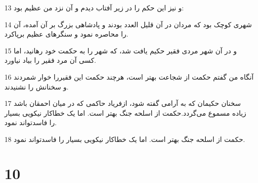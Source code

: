 \par 13 و نیز این حکم را در زیر آفتاب دیدم و آن نزد من عظیم بود:
\par 14 شهری کوچک بود که مردان در آن قلیل العدد بودند و پادشاهی بزرگ بر آن آمده، آن را محاصره نمود و سنگرهای عظیم برپاکرد.
\par 15 و در آن شهر مردی فقیر حکیم یافت شد، که شهر را به حکمت خود رهانید، اما کسی آن مرد فقیر را بیاد نیاورد.
\par 16 آنگاه من گفتم حکمت از شجاعت بهتر است، هر‌چند حکمت این فقیررا خوار شمردند و سخنانش را نشنیدند.
\par 17 سخنان حکیمان که به آرامی گفته شود، ازفریاد حاکمی که در میان احمقان باشد زیاده مسموع می‌گردد.حکمت از اسلحه جنگ بهتر است. اما یک خطاکار نیکویی بسیار را فاسدتواند نمود.
\par 18 حکمت از اسلحه جنگ بهتر است. اما یک خطاکار نیکویی بسیار را فاسدتواند نمود.
 
\chapter{10}

